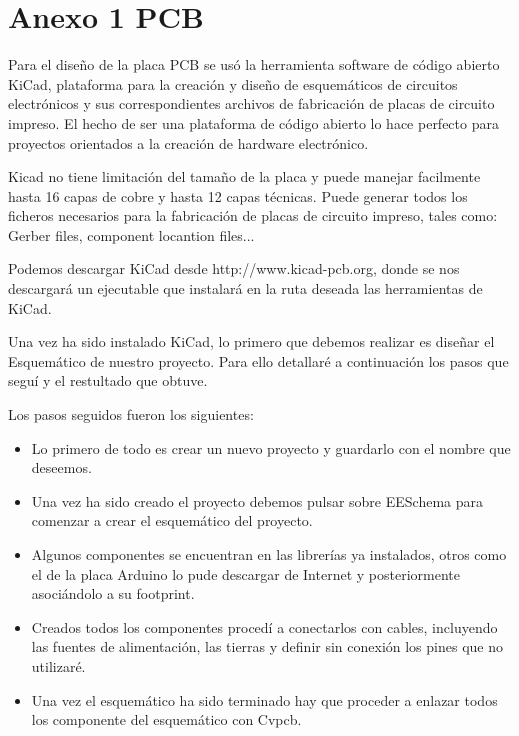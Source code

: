 	\chapter*{Anexo 1 PCB} %
	
		Para el dise\~no de la placa PCB se us\'o la herramienta software de c\'odigo abierto KiCad, plataforma para la creaci\'on y dise\~no de esquem\'aticos de circuitos electr\'onicos y sus correspondientes archivos de fabricaci\'on de placas de circuito impreso. El hecho de ser una plataforma de c\'odigo abierto lo hace perfecto para proyectos orientados a la creaci\'on de hardware electr\'onico.
		
		Kicad no tiene limitaci\'on del tama\~no de la placa y puede manejar facilmente hasta 16 capas de cobre y hasta 12 capas t\'ecnicas. Puede generar todos los ficheros necesarios para la fabricaci\'on de placas de circuito impreso, tales como: Gerber files, component locantion files...
		
		Podemos descargar KiCad desde http://www.kicad-pcb.org, donde se nos descargar\'a un ejecutable que instalar\'a en la ruta deseada las herramientas de KiCad.
		
		Una vez ha sido instalado KiCad, lo primero que debemos realizar es dise\~nar el Esquem\'atico de nuestro proyecto. Para ello detallar\'e a continuaci\'on los pasos que segu\'i y el restultado que obtuve.
		
		Los pasos seguidos fueron los siguientes:
		
		\begin{itemize}	
			
			\item Lo primero de todo es crear un nuevo proyecto y guardarlo con el nombre que deseemos.
			
			\item Una vez ha sido creado el proyecto debemos pulsar sobre EESchema para comenzar a crear el esquem\'atico del proyecto.
			
			\item Algunos componentes se encuentran en las librer\'ias ya instalados, otros como el de la placa Arduino lo pude descargar de Internet y posteriormente asoci\'andolo a su footprint.
			
			\item Creados todos los componentes proced\'i a conectarlos con cables, incluyendo las fuentes de alimentaci\'on, las tierras y definir sin conexi\'on los pines que no utilizar\'e.
			
			\item Una vez el esquem\'atico ha sido terminado hay que proceder a enlazar todos los componente del esquem\'atico con Cvpcb.
			
		\end{itemize}
		
